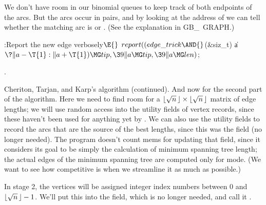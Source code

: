 We don't have room in our binomial queues to keep track of both
endpoints of the arcs. But the arcs occur in pairs, and by looking
at the address of  we can tell whether the matching arc is
 or . (See the explanation in {\sc GB\_%
\,GRAPH}.)

\Y\B\4:Report the new edge verbosely\X${}\E{}$\6
$\\{report}((\\{edge\_trick}\AND{}$(\&{siz\_t}) \|a${}\?\|a-\T{1}:\|a+\T{1})\MG%
\\{tip},\39\|a\MG\\{tip},\39\|a\MG\\{len}){}$;\par
{}.\fi

Cheriton, Tarjan, and Karp's algorithm (continued).
And now for the second part of the algorithm. Here we need to
find room for a $\hbox{$\lfloor\sqrt n\,\rfloor$}\times\hbox{$\lfloor\sqrt n\,\rfloor$}$ matrix of edge lengths;
we will use random access into the  utility fields of vertex records,
since these haven't been used for anything yet by .
We can also use the  utility fields to record the arcs that
are the source of the best lengths, since this was the 
field (no longer needed). The program doesn't count mems for
updating that field, since it considers its goal to be simply
the calculation of minimum spanning tree length; the actual
edges of the minimum spanning tree are computed only for
 mode. (We want to see how competitive 
is
when we streamline it as much as possible.)

In stage 2, the vertices will be assigned integer index numbers
between 0 and $\hbox{$\lfloor\sqrt n\,\rfloor$}-1$. We'll put this into the  field,
which is no longer needed, and call it .

